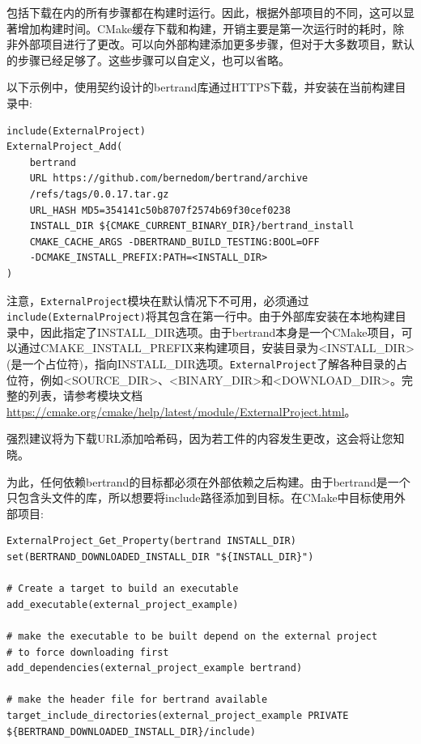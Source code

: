 包括下载在内的所有步骤都在构建时运行。因此，根据外部项目的不同，这可以显著增加构建时间。CMake缓存下载和构建，开销主要是第一次运行时的耗时，除非外部项目进行了更改。可以向外部构建添加更多步骤，但对于大多数项目，默认的步骤已经足够了。这些步骤可以自定义，也可以省略。

以下示例中，使用契约设计的bertrand库通过HTTPS下载，并安装在当前构建目录中:

\begin{lstlisting}[style=styleCMake]
include(ExternalProject)
ExternalProject_Add(
	bertrand
	URL https://github.com/bernedom/bertrand/archive
	/refs/tags/0.0.17.tar.gz
	URL_HASH MD5=354141c50b8707f2574b69f30cef0238
	INSTALL_DIR ${CMAKE_CURRENT_BINARY_DIR}/bertrand_install
	CMAKE_CACHE_ARGS -DBERTRAND_BUILD_TESTING:BOOL=OFF
	-DCMAKE_INSTALL_PREFIX:PATH=<INSTALL_DIR>
)
\end{lstlisting} 

注意，\texttt{ExternalProject}模块在默认情况下不可用，必须通过\texttt{include(ExternalProject)}将其包含在第一行中。由于外部库安装在本地构建目录中，因此指定了INSTALL\_DIR选项。由于bertrand本身是一个CMake项目，可以通过CMAKE\_INSTALL\_PREFIX来构建项目，安装目录为<INSTALL\_DIR>(是一个占位符)，指向INSTALL\_DIR选项。\texttt{ExternalProject}了解各种目录的占位符，例如<SOURCE\_DIR>、<BINARY\_DIR>和<DOWNLOAD\_DIR>。完整的列表，请参考模块文档\url{https://cmake.org/cmake/help/latest/module/ExternalProject.html}。

\begin{tcolorbox}[colback=blue!5!white,colframe=blue!75!black,title=验证下载]
强烈建议将为下载URL添加哈希码，因为若工件的内容发生更改，这会将让您知晓。
\end{tcolorbox}

为此，任何依赖bertrand的目标都必须在外部依赖之后构建。由于bertrand是一个只包含头文件的库，所以想要将include路径添加到目标。在CMake中目标使用外部项目:

\begin{lstlisting}[style=styleCMake]
ExternalProject_Get_Property(bertrand INSTALL_DIR)
set(BERTRAND_DOWNLOADED_INSTALL_DIR "${INSTALL_DIR}")

# Create a target to build an executable
add_executable(external_project_example)

# make the executable to be built depend on the external project
# to force downloading first
add_dependencies(external_project_example bertrand)

# make the header file for bertrand available
target_include_directories(external_project_example PRIVATE
${BERTRAND_DOWNLOADED_INSTALL_DIR}/include)
\end{lstlisting}

